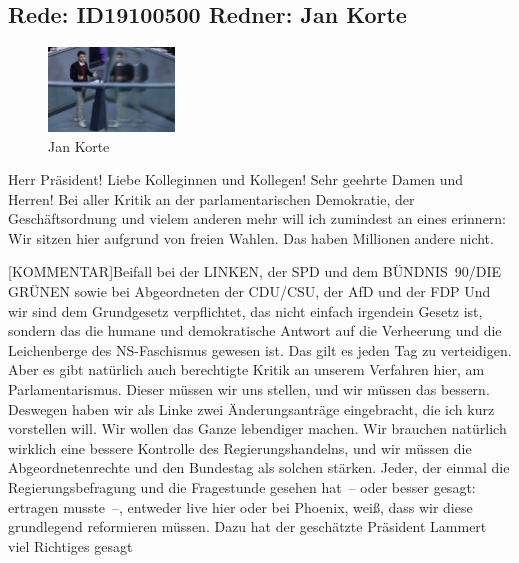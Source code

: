 \documentclass[a4paper,11pt]{article}
\begin{document}
\subsection{Rede: ID19100500  Redner: Jan Korte}

\begin{figure}[ht]

\centering

\includegraphics[width=0.3\textwidth]{Jan_Korte.jpg}

\caption{Jan Korte}

\end{figure}

Herr Präsident! Liebe Kolleginnen und Kollegen! Sehr geehrte Damen und Herren! Bei aller Kritik an der parlamentarischen Demokratie, der Geschäftsordnung und vielem anderen mehr will ich zumindest an eines erinnern: Wir sitzen hier aufgrund von freien Wahlen. Das haben Millionen andere nicht.

[KOMMENTAR]Beifall bei der LINKEN, der SPD und dem BÜNDNIS 90/DIE GRÜNEN sowie bei Abgeordneten der CDU/CSU, der AfD und der FDP
 Und wir sind dem Grundgesetz verpflichtet, das nicht einfach irgendein Gesetz ist, sondern das die humane und demokratische Antwort auf die Verheerung und die Leichenberge des NS-Faschismus gewesen ist. Das gilt es jeden Tag zu verteidigen. Aber es gibt natürlich auch berechtigte Kritik an unserem Verfahren hier, am Parlamentarismus. Dieser müssen wir uns stellen, und wir müssen das bessern. Deswegen haben wir als Linke zwei Änderungsanträge eingebracht, die ich kurz vorstellen will. Wir wollen das Ganze lebendiger machen. Wir brauchen natürlich wirklich eine bessere Kontrolle des Regierungshandelns, und wir müssen die Abgeordnetenrechte und den Bundestag als solchen stärken. Jeder, der einmal die Regierungsbefragung und die Fragestunde gesehen hat – oder besser gesagt: ertragen musste –, entweder live hier oder bei Phoenix, weiß, dass wir diese grundlegend reformieren müssen. Dazu hat der geschätzte Präsident Lammert viel Richtiges gesagt
\end{document}
